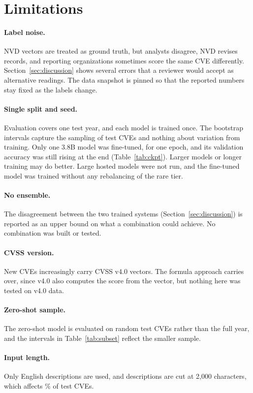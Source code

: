 \section{Limitations}\label{sec:limitations}

\paragraph{Label noise.}
NVD vectors are treated as ground truth, but analysts disagree, NVD revises records, and reporting organizations sometimes score the same CVE differently.
Section~\ref{sec:discussion} shows several errors that a reviewer would accept as alternative readings.
The data snapshot is pinned so that the reported numbers stay fixed as the labels change.

\paragraph{Single split and seed.}
Evaluation covers one test year, and each model is trained once.
The bootstrap intervals capture the sampling of test CVEs and nothing about variation from training.
Only one 3.8B model was fine-tuned, for one epoch, and its validation accuracy was still rising at the end (Table~\ref{tab:ckpt}).
Larger models or longer training may do better.
Large hosted models were not run, and the fine-tuned model was trained without any rebalancing of the rare tier.

\paragraph{No ensemble.}
The disagreement between the two trained systems (Section~\ref{sec:discussion}) is reported as an upper bound on what a combination could achieve.
No combination was built or tested.

\paragraph{CVSS version.}
New CVEs increasingly carry CVSS v4.0 vectors.
The formula approach carries over, since v4.0 also computes the score from the vector, but nothing here was tested on v4.0 data.

\paragraph{Zero-shot sample.}
The zero-shot model is evaluated on \nSub{} random test CVEs rather than the full year, and the intervals in Table~\ref{tab:subset} reflect the smaller sample.

\paragraph{Input length.}
Only English descriptions are used, and descriptions are cut at 2,000 characters, which affects \nTestClipped\% of test CVEs.

